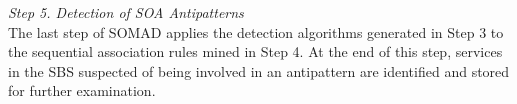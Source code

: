 \noindent \emph{Step 5. Detection of SOA Antipatterns}
\vspace{0.1cm}
\\
\noindent The last step of SOMAD applies the detection algorithms generated in Step 3 to the sequential association rules mined in Step 4. At the end of this step, services in the SBS suspected of being involved in an antipattern are identified and stored for further examination.